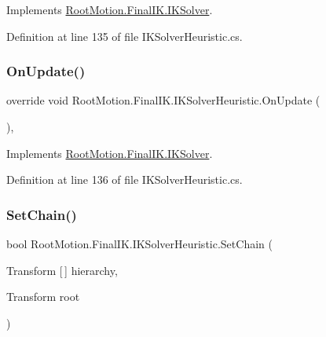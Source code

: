 Implements \mbox{\hyperlink{class_root_motion_1_1_final_i_k_1_1_i_k_solver_a2a8cbf1dfed274fdbc79ff011c468cc6}{Root\+Motion.\+Final\+I\+K.\+I\+K\+Solver}}.



Definition at line 135 of file I\+K\+Solver\+Heuristic.\+cs.

\mbox{\label{class_root_motion_1_1_final_i_k_1_1_i_k_solver_heuristic_a88c1314811a687a2843f8679c07e82c0}} 
\subsubsection{\texorpdfstring{On\+Update()}{OnUpdate()}}
{\footnotesize\ttfamily override void Root\+Motion.\+Final\+I\+K.\+I\+K\+Solver\+Heuristic.\+On\+Update (\begin{DoxyParamCaption}{ }\end{DoxyParamCaption})\hspace{0.3cm}{\ttfamily [protected]}, {\ttfamily [virtual]}}



Implements \mbox{\hyperlink{class_root_motion_1_1_final_i_k_1_1_i_k_solver_a3bbcc10c91d82ac266dadc63ea93171d}{Root\+Motion.\+Final\+I\+K.\+I\+K\+Solver}}.



Definition at line 136 of file I\+K\+Solver\+Heuristic.\+cs.

\mbox{\label{class_root_motion_1_1_final_i_k_1_1_i_k_solver_heuristic_a3bc403bfbc0adc7dadd1367b46726669}} 
\subsubsection{\texorpdfstring{Set\+Chain()}{SetChain()}}
{\footnotesize\ttfamily bool Root\+Motion.\+Final\+I\+K.\+I\+K\+Solver\+Heuristic.\+Set\+Chain (\begin{DoxyParamCaption}\item[{Transform \mbox{[}$\,$\mbox{]}}]{hierarchy,  }\item[{Transform}]{root }\end{DoxyParamCaption})}



